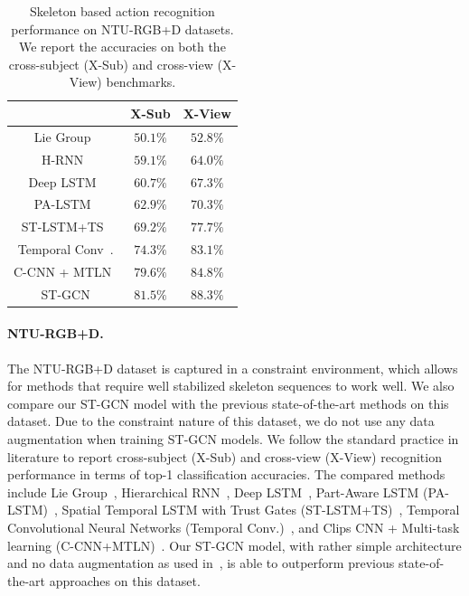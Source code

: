 \documentclass[letterpaper]{article} %
\begin{document}
\begin{table}
	\small
	\centering
	\begin{tabular}{c|c|c}\hline
		& X-Sub& X-View \\ \hline
		Lie Group~\cite{Veeriah2015CVPR}		& $ 50.1 \% $ & $ 52.8 \% $ \\
		H-RNN~\cite{Du2015CVPR}		& $ 59.1 \% $& $ 64.0 \% $ \\
		Deep LSTM~\cite{Shahroudy2016CVPR}		& $ 60.7 \% $& $ 67.3 \% $ \\
		PA-LSTM~\cite{Shahroudy2016CVPR}			& $ 62.9 \% $& $ 70.3 \% $ \\
		ST-LSTM+TS~\cite{Liu2016ECCV}		& $ 69.2 \% $& $ 77.7 \% $ \\
		Temporal Conv~\cite{Kim2017CVPRW}.		& $ 74.3 \% $ & $ 83.1 \% $ \\
		C-CNN + MTLN~\cite{Ke2017CVPR}		& $ 79.6 \% $& $ 84.8 \% $ \\
		\hline
		ST-GCN 			& $\mathbf{81.5\%} $ & $ \mathbf{88.3\%} $ \\\hline
	\end{tabular}
	\caption{Skeleton based action recognition performance on NTU-RGB+D datasets. We report the accuracies on both the cross-subject (X-Sub) and cross-view (X-View) benchmarks.}\label{tab:ntu}
\end{table}

\paragraph{NTU-RGB+D.}
The NTU-RGB+D dataset is captured in a constraint environment, which allows for methods that require well stabilized skeleton sequences to work well.
We also compare our ST-GCN model with the previous state-of-the-art methods on this dataset.
Due to the constraint nature of this dataset, we do not use any data augmentation when training ST-GCN models.
We follow the standard practice in literature to report cross-subject (X-Sub) and cross-view (X-View) recognition performance in terms of top-1 classification accuracies.
The compared methods include Lie Group~\cite{Veeriah2015CVPR}, Hierarchical RNN~\cite{Du2015CVPR}, Deep LSTM~\cite{Shahroudy2016CVPR}, Part-Aware LSTM (PA-LSTM)~\cite{Shahroudy2016CVPR}, Spatial Temporal LSTM with Trust Gates (ST-LSTM+TS)~\cite{Liu2016ECCV}, Temporal Convolutional Neural Networks (Temporal Conv.)~\cite{Kim2017CVPRW}, and Clips CNN + Multi-task learning (C-CNN+MTLN)~\cite{Ke2017CVPR}.
Our ST-GCN model, with rather simple architecture and no data augmentation as used in~\cite{Kim2017CVPRW,Ke2017CVPR}, is able to outperform previous state-of-the-art approaches on this dataset.
\end{document}
